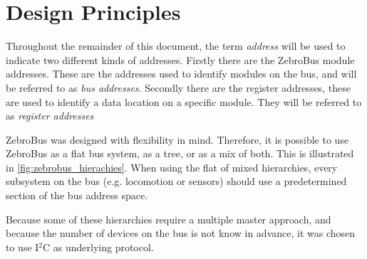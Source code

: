 \section{Design Principles}
Throughout the remainder of this document, the term \emph{address} will be used to indicate two different kinds of addresses.
Firstly there are the ZebroBus module addresses.
These are the addresses used to identify modules on the bus, and will be referred to as \emph{bus addresses}.
Secondly there are the register addresses, these are used to identify a data location on a specific module.
They will be referred to as \emph{register addresses}

ZebroBus was designed with flexibility in mind.
Therefore, it is possible to use ZebroBus as a flat bus system, as a tree, or as a mix of both.
This is illustrated in \cref{fig:zebrobus_hierachies}.
When using the flat of mixed hierarchies, every subsystem on the bus (e.g. locomotion or sensors) should use a predetermined
section of the bus address space.

Because some of these hierarchies require a multiple master approach, and because the number of devices on the bus is not know in advance,
it was chosen to use I$^2$C as underlying protocol.

